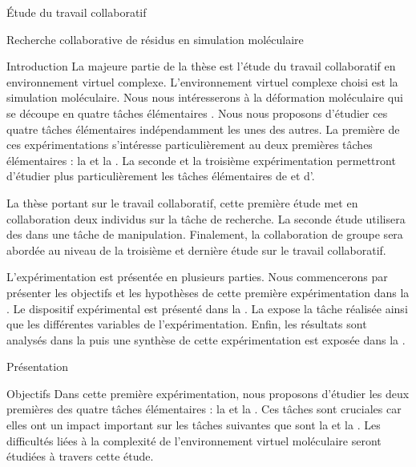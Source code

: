 \documentclass[myfrancais]{mythesis}
\begin{document}
	\begin{mypart}{Étude du travail collaboratif}
		\begin{mychapter}{Recherche collaborative de résidus en simulation moléculaire}
			\begin{mysection}{Introduction}
				La majeure partie de la thèse est l'étude du travail collaboratif en environnement virtuel complexe.
				L'environnement virtuel complexe choisi est la simulation moléculaire.
				Nous nous intéresserons à la déformation moléculaire qui se découpe en quatre tâches élémentaires .
				Nous nous proposons d'étudier ces quatre tâches élémentaires indépendamment les unes des autres.
				La première de ces expérimentations s'intéresse particulièrement au deux premières tâches élémentaires : la  et la .
				La seconde et la troisième expérimentation permettront d'étudier plus particulièrement les tâches élémentaires de  et d'.

				La thèse portant sur le travail collaboratif, cette première étude met en collaboration deux individus sur la tâche de recherche.
				La seconde étude utilisera des  dans une tâche de manipulation.
				Finalement, la collaboration de groupe sera abordée au niveau de la troisième et dernière étude sur le travail collaboratif.

				L'expérimentation est présentée en plusieurs parties.
				Nous commencerons par présenter les objectifs et les hypothèses de cette première expérimentation dans la .
				Le dispositif expérimental est présenté dans la .
				La  expose la tâche réalisée ainsi que les différentes variables de l'expérimentation.
				Enfin, les résultats sont analysés dans la  puis une synthèse de cette expérimentation est exposée dans la .
			\end{mysection}
			\begin{mysection}{Présentation}
				\begin{mysubsection}{Objectifs}
					Dans cette première expérimentation, nous proposons d'étudier les deux premières des quatre tâches élémentaires : la  et la .
					Ces tâches sont cruciales car elles ont un impact important sur les tâches suivantes que sont la  et la .
					Les difficultés liées à la complexité de l'environnement virtuel moléculaire seront étudiées à travers cette étude.


\end{mysubsection}
\end{mysection}
\end{mychapter}
\end{mypart}
\end{document}
